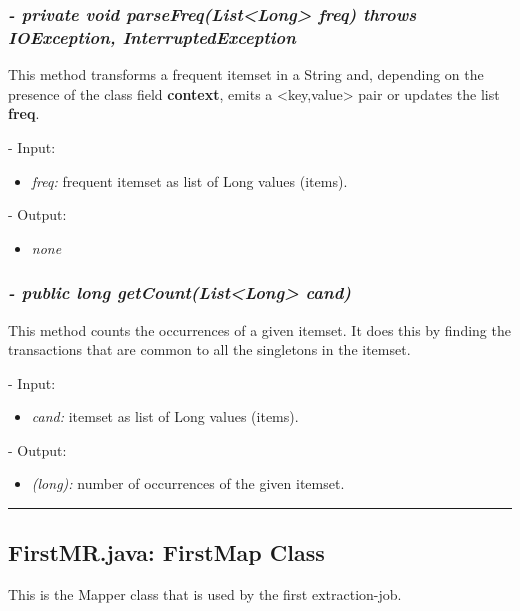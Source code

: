 \documentclass[]{report}
\begin{document}
	\subsubsection*{\textit{\textbf{-} private void parseFreq(List<Long> freq) throws IOException, InterruptedException}}   	
	This method transforms a frequent itemset in a String and, depending on the presence of the class field \textbf{context}, emits a <key,value> pair or updates the list \textbf{freq}.  
	\begin{description}
		\item - Input:
		\begin{itemize}
			\item \textit{freq:} frequent itemset as list of Long values (items).
		\end{itemize}
	\end{description}	
	\begin{description}
		\item - Output:
		\begin{itemize}
			\item \textit{none} 
		\end{itemize}
	\end{description}
	
	\subsubsection*{\textit{\textbf{-} public long getCount(List<Long> cand)}}   	
	This method counts the occurrences of a given itemset. It does this by finding the transactions that are common to all the singletons in the itemset.    
	\begin{description}
		\item - Input:
		\begin{itemize}
			\item \textit{cand:} itemset as list of Long values (items).
		\end{itemize}
	\end{description}	
	\begin{description}
		\item - Output:
		\begin{itemize}
			\item \textit{(long):} number of occurrences of the given itemset. 
		\end{itemize}
	\end{description}


	\rule{\textwidth}{0.4pt}	

	\subsection*{FirstMR.java: FirstMap Class}
	This is the Mapper class that is used by the first extraction-job. 
\end{document}
